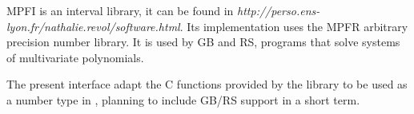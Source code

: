 %
%
%
%
% 
%

MPFI is an interval library, it can be found in
\emph{http://perso.ens-lyon.fr/nathalie.revol/software.html}.
Its implementation uses the MPFR arbitrary precision number library.
It is used by GB and RS, programs that solve systems of multivariate
polynomials.

The present interface adapt the C functions provided by the library to be
used as a number type in {\cgal}, planning to include GB/RS support in a
short term.

